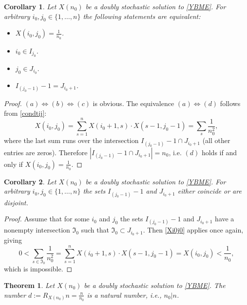 \documentclass{article}
\newtheorem{theorem}{Theorem}[section]
\newtheorem{corollary}{Corollary}[section]
\theoremstyle{definition}\newtheorem{example}{Example}[section]
\begin{document}
	\begin{corollary}\label{samesets}
		Let $X(n_0)$ be a doubly stochastic solution to \eqref{YBME}. For arbitrary  $i_0,j_0\in\{1,\ldots,n\}$ the following statements are equivalent:
		\begin{itemize}
			\item[(a)] $X(i_0,j_0)=\frac{1}{n_0}$.
			\item[(b)] $i_0\in I_{j_0}$.
			\item[(c)] $j_0\in J_{i_0}$.
			\item[(d)] $I_{(j_0-1)}-1=J_{i_0+1}$.
		\end{itemize}
		
	\end{corollary}
	\begin{proof} $(a)\Leftrightarrow(b)\Leftrightarrow(c)$ is obvious. The equivalence $(a)\Leftrightarrow(d)$ follows from \eqref{condtij}:
		\begin{equation}
			\label{Xi0j0}
			X(i_0,j_0)=\sum_{s=1}^n X(i_0+1,s)\cdot X(s-1,j_0-1)=\sum_{s}\frac{1}{n_0^2},\end{equation}
		where the last sum runs over the intersection $I_{(j_0-1)}-1\cap J_{i_0+1}$ (all other entries are zeros). Therefore 
		$|I_{(j_0-1)}-1\cap J_{i_0+1}|=n_0$, i.e. $(d)$ holds if and only if $X(i_0,j_0)=\frac{1}{n_0}$.
	\end{proof}
	\begin{corollary}\label{disjoint}
		Let $X(n_0)$ be a doubly stochastic solution to \eqref{YBME}. For arbitrary  $i_0,j_0\in\{1,\ldots,n\}$ the sets $I_{(j_0-1)}-1$ and $J_{i_0+1}$ either coincide or are disjoint.
	\end{corollary}
	\begin{proof}
		Assume that for some $i_0$ and $j_0$ the sets $I_{(j_0-1)}-1$ and $J_{i_0+1}$ have a nonempty intersection $\mathfrak{I}_0$ such that $\mathfrak{I}_0\subset J_{i_0+1}$. Then \eqref{Xi0j0} applies once again, giving
		$$0<\sum_{s\in\mathfrak{I}_0}\frac{1}{n_0^2}=\sum_{s=1}^n X(i_0+1,s)\cdot X(s-1,j_0-1)=X(i_0,j_0)<\frac{1}{n_0},$$ 
		which is impossible.
	\end{proof}
	\begin{theorem}\label{divisors}
		Let $X(n_0)$ be a doubly stochastic solution to \eqref{YBME}. The number $d:=R_{X(n_0)}n=\frac{n}{n_0}$ is a natural number, i.e., $n_0|n$.
	\end{theorem}
\end{document}
